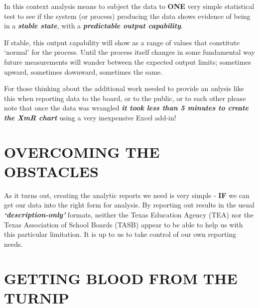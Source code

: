 \documentclass[
  letterpaper,
  DIV=11,
  numbers=noendperiod]{scrartcl}
\begin{document}
In this context analysis means to subject the data to \textbf{ONE} very
simple statistical test to see if the system (or process) producing the
data shows evidence of being in a \textbf{\emph{stable state}}, with a
\textbf{\emph{predictable output capability}}.

If stable, this output capability will show as a range of values that
constitute `normal' for the process. Until the process itself changes in
some fundamental way future measurements will wander between the
expected output limits; sometimes upward, sometimes downward, sometimes
the same.

\begin{tcolorbox}[enhanced jigsaw, leftrule=.75mm, breakable, opacityback=0, toptitle=1mm, coltitle=black, opacitybacktitle=0.6, bottomrule=.15mm, colbacktitle=quarto-callout-note-color!10!white, colframe=quarto-callout-note-color-frame, arc=.35mm, bottomtitle=1mm, titlerule=0mm, title=\textcolor{quarto-callout-note-color}{\faInfo}\hspace{0.5em}{Note}, colback=white, rightrule=.15mm, left=2mm, toprule=.15mm]

For those thinking about the additional work needed to provide an
anlysis like this when reporting data to the board, or to the public, or
to each other please note that once the data was wrangled
\textbf{\emph{it took less than 5 minutes to create the XmR chart}}
using a very inexpensive Excel add-in!

\end{tcolorbox}

\vspace{0.3in}

\section{\texorpdfstring{\textbf{OVERCOMING THE
OBSTACLES}}{OVERCOMING THE OBSTACLES}}\label{overcoming-the-obstacles}

As it turns out, creating the analytic reports we need is very simple -
\textbf{IF} we can get our data into the right form for analysis. By
reporting out results in the usual \textbf{\emph{`description-only'}}
formats, neither the Texas Education Agency (TEA) nor the Texas
Association of School Boards (TASB) appear to be able to help us with
this particular limitation. It is up to us to take control of our own
reporting needs.

\vspace{0.3in}

\section{\texorpdfstring{\textbf{GETTING BLOOD FROM THE
TURNIP}}{GETTING BLOOD FROM THE TURNIP}}\label{getting-blood-from-the-turnip}
\end{document}
